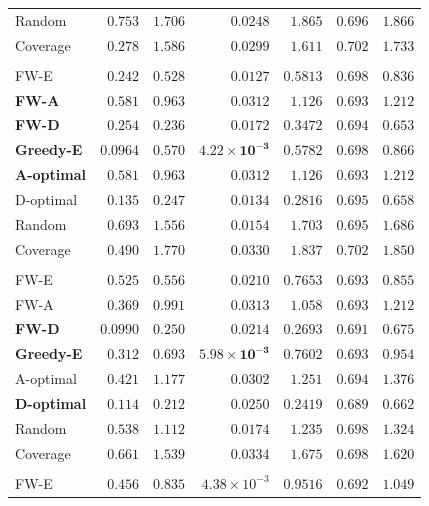 \documentclass[letterpaper, 9
 pt, conference]{ieeeconf}
\begin{document}
\begin{table}[ht]
\begin{tabular}{lrrrrrr}
Random & $0.753$ & $1.706$ & $0.0248$ & $1.865$ & $0.696$ & $1.866$ \\
Coverage & $0.278$ & $1.586$ & $0.0299$ & $1.611$ & $0.702$ & $1.733$ \\
\addlinespace[1pt]
\multicolumn{7}{l}{\textit{$K{=}30$}} \\[1pt]
FW-E & $0.242$ & $0.528$ & $0.0127$ & $0.5813$ & $0.698$ & $0.836$ \\
\textbf{FW-A} & $0.581$ & $0.963$ & $0.0312$ & $1.126$ & $\mathbf{0.693}$ & $1.212$ \\
\textbf{FW-D} & $0.254$ & $\mathbf{0.236}$ & $0.0172$ & $0.3472$ & $0.694$ & $\mathbf{0.653}$ \\
\textbf{Greedy-E} & $\mathbf{0.0964}$ & $0.570$ & $\mathbf{4.22\!\times\!10^{-3}}$ & $0.5782$ & $0.698$ & $0.866$ \\
\textbf{A-optimal} & $0.581$ & $0.963$ & $0.0312$ & $1.126$ & $\mathbf{0.693}$ & $1.212$ \\
D-optimal & $0.135$ & $0.247$ & $0.0134$ & $\mathbf{0.2816}$ & $0.695$ & $0.658$ \\
Random & $0.693$ & $1.556$ & $0.0154$ & $1.703$ & $0.695$ & $1.686$ \\
Coverage & $0.490$ & $1.770$ & $0.0330$ & $1.837$ & $0.702$ & $1.850$ \\
\addlinespace[1pt]
\multicolumn{7}{l}{\textit{$K{=}40$}} \\[1pt]
FW-E & $0.525$ & $0.556$ & $0.0210$ & $0.7653$ & $0.693$ & $0.855$ \\
FW-A & $0.369$ & $0.991$ & $0.0313$ & $1.058$ & $0.693$ & $1.212$ \\
\textbf{FW-D} & $\mathbf{0.0990}$ & $0.250$ & $0.0214$ & $0.2693$ & $0.691$ & $0.675$ \\
\textbf{Greedy-E} & $0.312$ & $0.693$ & $\mathbf{5.98\!\times\!10^{-3}}$ & $0.7602$ & $0.693$ & $0.954$ \\
A-optimal & $0.421$ & $1.177$ & $0.0302$ & $1.251$ & $0.694$ & $1.376$ \\
\textbf{D-optimal} & $0.114$ & $\mathbf{0.212}$ & $0.0250$ & $\mathbf{0.2419}$ & $\mathbf{0.689}$ & $\mathbf{0.662}$ \\
Random & $0.538$ & $1.112$ & $0.0174$ & $1.235$ & $0.698$ & $1.324$ \\
Coverage & $0.661$ & $1.539$ & $0.0334$ & $1.675$ & $0.698$ & $1.620$ \\
\addlinespace[1pt]
\multicolumn{7}{l}{\textit{$K{=}50$}} \\[1pt]
FW-E & $0.456$ & $0.835$ & $4.38\!\times\!10^{-3}$ & $0.9516$ & $0.692$ & $1.049$ \\

\end{tabular}
\end{table}
\end{document}
